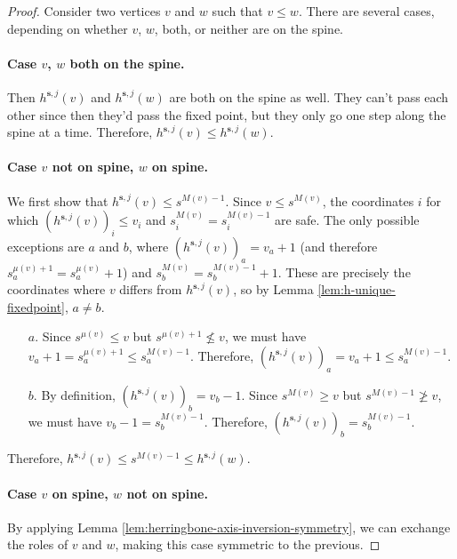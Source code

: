 \documentclass[11pt]{article}
\begin{document}
\lemmamonotone*
\begin{proof}
    Consider two vertices $v$ and $w$ such that $v \leq w$. There are several cases, depending on whether $v$, $w$, both, or neither are on the spine.
    \paragraph{Case $v$, $w$ both on the spine.} Then $h^{\mathbf{s}, j}(v)$ and $h^{\mathbf{s}, j}(w)$ are both on the spine as well. They can't pass each other since then they'd pass the fixed point, but they only go one step along the spine at a time. Therefore, $h^{\mathbf{s}, j}(v) \leq h^{\mathbf{s}, j}(w)$.
    \paragraph{Case $v$ not on spine, $w$ on spine.} We first show that $h^{\mathbf{s}, j}(v) \leq s^{M(v)-1}$. Since $v \leq s^{M(v)}$, the coordinates $i$ for which $(h^{\mathbf{s}, j}(v))_i \leq v_i$ and $s^{M(v)}_i = s^{M(v)-1}_i$ are safe. The only possible exceptions are $a$ and $b$, where $(h^{\mathbf{s}, j}(v))_a = v_a + 1$ (and therefore $s^{\mu(v)+1}_a = s^{\mu(v)}_a+1$) and $s^{M(v)}_b = s^{M(v)-1}_b + 1$. These are precisely the coordinates where $v$ differs from $h^{\mathbf{s}, j}(v)$, so by Lemma \ref{lem:h-unique-fixedpoint}, $a \neq b$.
    \begin{itemize}
        \item[$a$.] Since $s^{\mu(v)} \leq v$ but $s^{\mu(v)+1} \not \leq v$, we must have $v_a + 1 = s^{\mu(v)+1}_a \leq s^{M(v)-1}_a$. Therefore, $(h^{\mathbf{s}, j}(v))_a = v_a + 1 \leq s^{M(v)-1}_a$.
        \item[$b$.] By definition, $(h^{\mathbf{s}, j}(v))_b = v_b - 1$. Since $s^{M(v)} \geq v$ but $s^{M(v)-1} \not \geq v$, we must have $v_b - 1 = s^{M(v)-1}_b$. Therefore, $(h^{\mathbf{s}, j}(v))_b = s^{M(v)-1}_b$.
    \end{itemize}
    Therefore, $h^{\mathbf{s}, j}(v) \leq s^{M(v)-1} \leq h^{\mathbf{s}, j}(w)$.
    \paragraph{Case $v$ on spine, $w$ not on spine.} By applying Lemma \ref{lem:herringbone-axis-inversion-symmetry}, we can exchange the roles of $v$ and $w$, making this case symmetric to the previous.

\end{proof}
\end{document}
